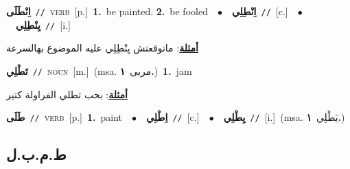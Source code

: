 \documentclass[10pt,a4paper,twoside]{article} %
\begin{document}
\begin{multicols}{2}
{\setlength\topsep{0pt}\textbf{\foreignlanguage{arabic}{اِنْطَلَى}}\ {\color{gray}\texttt{//}\color{black}}\ \textsc{verb}\ [p.]\ \textbf{1.}~be painted.  \textbf{2.}~be fooled\ \ $\bullet$\ \ \setlength\topsep{0pt}\textbf{\foreignlanguage{arabic}{اِنْطِلِي}}\ {\color{gray}\texttt{//}\color{black}}\ [c.]\ \ $\bullet$\ \ \setlength\topsep{0pt}\textbf{\foreignlanguage{arabic}{يِنْطِلِي}}\ {\color{gray}\texttt{//}\color{black}}\ [i.]\  \begin{flushright}\color{gray}\foreignlanguage{arabic}{\textbf{\underline{\foreignlanguage{arabic}{أمثلة}}}: ماتوقعتش يِنْطِلِي عليه الموضوع بهالسرعة}\end{flushright}\color{black}} \vspace{2mm}

{\setlength\topsep{0pt}\textbf{\foreignlanguage{arabic}{تَطْلِي}}\ {\color{gray}\texttt{//}\color{black}}\ \textsc{noun}\ [m.]\ \color{gray}(msa. \foreignlanguage{arabic}{مربى}~\foreignlanguage{arabic}{\textbf{١.}})\color{black}\ \textbf{1.}~jam\  \begin{flushright}\color{gray}\foreignlanguage{arabic}{\textbf{\underline{\foreignlanguage{arabic}{أمثلة}}}: بحب تطلي الفراولة كتير}\end{flushright}\color{black}} \vspace{2mm}

{\setlength\topsep{0pt}\textbf{\foreignlanguage{arabic}{طَلَى}}\ {\color{gray}\texttt{//}\color{black}}\ \textsc{verb}\ [p.]\ \textbf{1.}~paint\ \ $\bullet$\ \ \setlength\topsep{0pt}\textbf{\foreignlanguage{arabic}{اِطْلِي}}\ {\color{gray}\texttt{//}\color{black}}\ [c.]\ \ $\bullet$\ \ \setlength\topsep{0pt}\textbf{\foreignlanguage{arabic}{يِطْلِي}}\ {\color{gray}\texttt{//}\color{black}}\ [i.]\ \color{gray}(msa. \foreignlanguage{arabic}{يَطْلِي}~\foreignlanguage{arabic}{\textbf{١.}})\color{black}\ } \vspace{2mm}

\vspace{-3mm}
\subsection*{\color{blue}\foreignlanguage{arabic}{ط.م.ب.ل}\color{blue}{ (ntws)}} 


\end{multicols}
\end{document}
